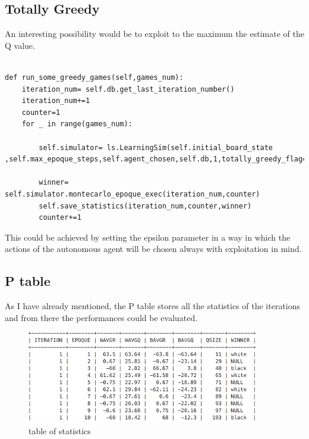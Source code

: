\documentclass{article}
\begin{document}
				\subsection{Totally Greedy}
				An interesting possibility would be to exploit to the maximum the estimate of the Q value.\medskip\\\\

				\begin{lstlisting}[caption=greedy run function, label=exepred]
def run_some_greedy_games(self,games_num):
	iteration_num= self.db.get_last_iteration_number()
	iteration_num+=1
	counter=1
	for _ in range(games_num):

		self.simulator= ls.LearningSim(self.initial_board_state ,self.max_epoque_steps,self.agent_chosen,self.db,1,totally_greedy_flag=True)

		winner= self.simulator.montecarlo_epoque_exec(iteration_num,counter)
		self.save_statistics(iteration_num,counter,winner)
		counter+=1
\end{lstlisting}

				\medskip
				This could be achieved by setting the epsilon parameter in a way in which the actions of the autonomous agent will be chosen always with exploitation in mind.\medskip\\
				
				\newpage
				\subsection{P table}

				As I have already mentioned, the P table stores all the statistics of the iterations and from there the performances could be evaluated.\medskip\\
				
\begin{center}	
\begin{figure}[h]
\centering
\includegraphics[width=0.9\textwidth]{p_table}
\caption{table of statistics}
\label{fig:7}
\end{figure}
\end{center}
\end{document}
